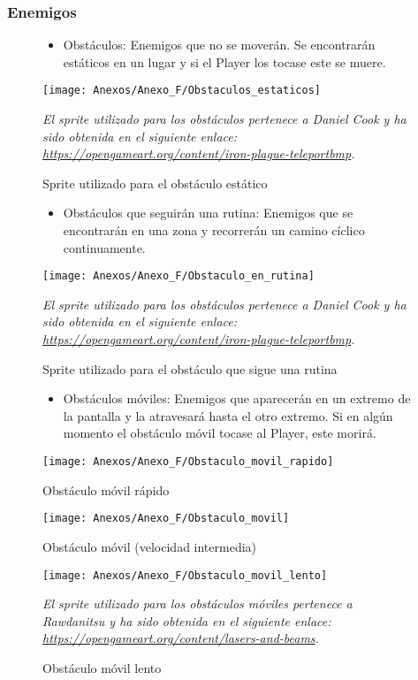 \subsubsection{Enemigos}
\begin{figure}[h]
\begin{itemize}
\item
Obstáculos: Enemigos que no se moverán. Se encontrarán estáticos en un lugar y si el Player los tocase este se muere.
\end{itemize}
\centering
\texttt{[image: Anexos/Anexo\_F/Obstaculos\_estaticos]}
\caption{Sprite utilizado para el obstáculo estático}
\raggedright
\textit{El sprite utilizado para los obstáculos pertenece a Daniel Cook y ha sido obtenida en el siguiente enlace: \url{https://opengameart.org/content/iron-plague-teleportbmp}.}
\end{figure}

\begin{figure}[h]
\begin{itemize}
\item
Obstáculos que seguirán una rutina: Enemigos que se encontrarán en una zona y recorrerán un camino cíclico continuamente.
\end{itemize}
\centering
\texttt{[image: Anexos/Anexo\_F/Obstaculo\_en\_rutina]}
\caption{Sprite utilizado para el obstáculo que sigue una rutina}
\raggedright
\textit{El sprite utilizado para los obstáculos pertenece a Daniel Cook y ha sido obtenida en el siguiente enlace: \url{https://opengameart.org/content/iron-plague-teleportbmp}.}
\end{figure}

\begin{figure}[h]
\begin{itemize}
\item
Obstáculos móviles: Enemigos que aparecerán en un extremo de la pantalla y la atravesará hasta el otro extremo. Si en algún momento el obstáculo móvil tocase al Player, este morirá.
\end{itemize}
\centering
\texttt{[image: Anexos/Anexo\_F/Obstaculo\_movil\_rapido]}
\caption{Obstáculo móvil rápido}
\end{figure}

\begin{figure}[h]
\centering
\texttt{[image: Anexos/Anexo\_F/Obstaculo\_movil]}
\caption{Obstáculo móvil (velocidad intermedia)}
\end{figure}

\begin{figure}[h]
\centering
\texttt{[image: Anexos/Anexo\_F/Obstaculo\_movil\_lento]}
\caption{Obstáculo móvil lento}
\raggedright
\textit{El sprite utilizado para los obstáculos móviles pertenece a Rawdanitsu y ha sido obtenida en el siguiente enlace: \url{https://opengameart.org/content/lasers-and-beams}.}
\end{figure}
\clearpage

